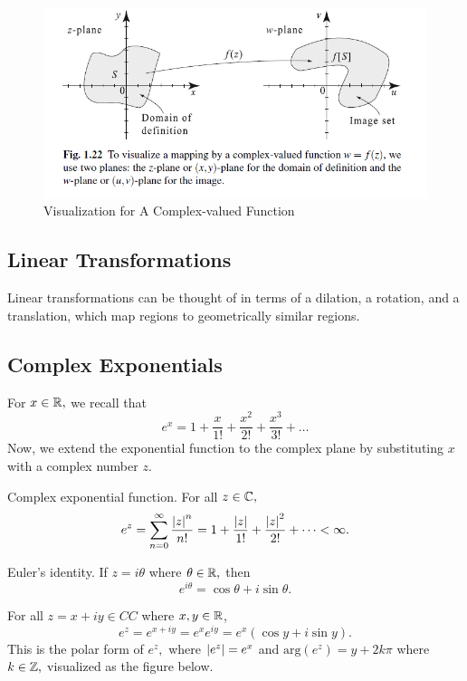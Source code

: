 \documentclass[11pt,reqno,oneside,a4paper]{article}
\begin{document}
\begin{figure}[htp]
	\centering
	\includegraphics[width=0.8\linewidth]{gfx/complex function vis.png}
	\caption{Visualization for A Complex-valued Function}
\end{figure}


\subsection{Linear Transformations}
Linear transformations can be thought of in terms of a dilation, a rotation, and a translation, which map regions to geometrically similar regions.


\subsection{Complex Exponentials}
For $x\in \mathbb R,$ we recall that $$e^x = 1 + \frac{x}{1!} + \frac{x^2}{2!} + \frac{x^3}{3!} + \dots$$
Now, we extend the exponential function to the complex plane by substituting $x$ with a complex number $z$. 

\begin{defn}{Complex exponential function.}
For all $z \in \mathbb C,$ 
$$e^z = \sum_{n=0}^{\infty} \frac{\left\lvert z\right\rvert^n}{n!} =1+\frac{\left\lvert z\right\rvert}{1!}+\frac{\left\lvert z\right\rvert^2}{2!} + \dots < \infty .$$
\end{defn}

\begin{thm}{Euler's identity.} 
If $z=i\theta$ where $\theta \in \mathbb R,$ then
$$e^{i\theta} = \cos \theta + i\sin\theta.$$
\end{thm}

\begin{cor}
For all $z = x+iy \in CC$ where $x, y \in \mathbb R$, $$e^z = e^{x+iy} = e^xe^{iy} = e^x(\cos y + i\sin y).$$
This is the polar form of $e^z,$ where $\left\lvert e^z\right\rvert = e^x$ and $\text{arg}(e^z) = y+2k\pi$ where $k\in\mathbb Z,$ visualized as the figure below.
\end{cor}
\end{document}
